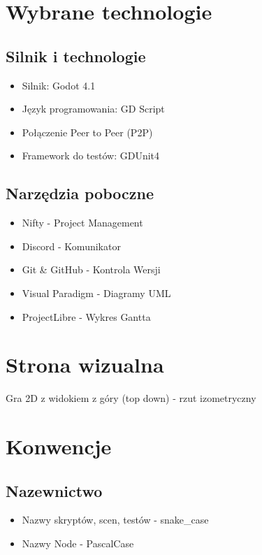 \documentclass[]{report}
\begin{document}
\section{Wybrane technologie}
\subsection{Silnik i technologie}
	\begin{itemize}
		\item Silnik: Godot 4.1
		\item Język programowania: GD Script
		\item Połączenie Peer to Peer (P2P)
		\item Framework do testów: GDUnit4
	\end{itemize}
\subsection{Narzędzia poboczne}
\begin{itemize}
	\item Nifty - Project Management
	\item Discord - Komunikator
	\item Git \& GitHub - Kontrola Wersji
	\item Visual Paradigm - Diagramy UML
	\item ProjectLibre - Wykres Gantta
\end{itemize}

\section{Strona wizualna}

 Gra 2D z widokiem z góry (top down) - rzut izometryczny

	



\section{Konwencje}
\subsection{Nazewnictwo}
	\begin{itemize}
		\item Nazwy skryptów, scen, testów - snake\_case
		\item Nazwy Node - PascalCase
	
	\end{itemize}
\end{document}
